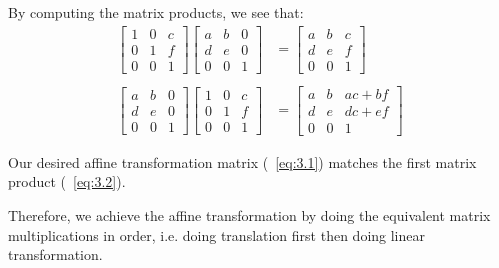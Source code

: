 \begin{Answer}
  By computing the matrix products, we see that:
  \begin{align}
    \begin{bmatrix}
      1 & 0 & c \\
      0 & 1 & f \\
      0 & 0 & 1
    \end{bmatrix}
    \begin{bmatrix}
      a & b & 0 \\
      d & e & 0 \\
      0 & 0 & 1
    \end{bmatrix}
    &= 
    \begin{bmatrix}
      a & b & c \\
      d & e & f \\
      0 & 0 & 1
    \end{bmatrix}~\label{eq:3.2} \\
    \nonumber \\
    \begin{bmatrix}
      a & b & 0 \\
      d & e & 0 \\
      0 & 0 & 1
    \end{bmatrix}
    \begin{bmatrix}
      1 & 0 & c \\
      0 & 1 & f \\
      0 & 0 & 1
    \end{bmatrix}
    &=
    \begin{bmatrix}
      a & b & ac + bf \\
      d & e & dc + ef \\
      0 & 0 & 1
    \end{bmatrix}
  \end{align}

  \step
  Our desired affine transformation matrix (~\ref{eq:3.1}) matches the first
  matrix product (~\ref{eq:3.2}).

  \step
  Therefore, we achieve the affine transformation by doing
  the equivalent matrix multiplications in order,
  i.e. doing translation first then doing linear transformation.
\end{Answer}
